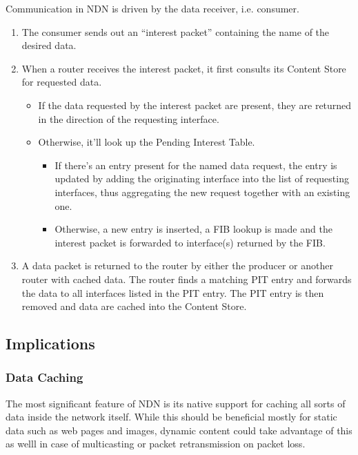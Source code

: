                 Communication in NDN is driven by the data receiver, i.e. consumer.

                \begin{enumerate}
                    \item The consumer sends out an ``interest packet'' containing the name of the desired data.
                    \item When a router receives the interest packet, it first consults its Content Store for requested data.
                        \begin{itemize}
                            \item If the data requested by the interest packet are present, they are returned in the direction of the requesting interface.
                            \item Otherwise, it'll look up the Pending Interest Table.
                            \begin{itemize}
                                \item If there's an entry present for the named data request, the entry is updated by adding the originating interface into the list of requesting interfaces, thus aggregating the new request together with an existing one.
                                \item Otherwise, a new entry is inserted, a FIB lookup is made and the interest packet is forwarded to interface(s) returned by the FIB.
                            \end{itemize}
                        \end{itemize}
                    \item A data packet is returned to the router by either the producer or another router with cached data. The router finds a matching PIT entry and forwards the data to all interfaces listed in the PIT entry. The PIT entry is then removed and data are cached into the Content Store.
                \end{enumerate}

        \subsection{Implications}
            \subsubsection{Data Caching}
                The most significant feature of NDN is its native support for caching all sorts of data inside the network itself. While this should be beneficial mostly for static data such as web pages and images, dynamic content could take advantage of this as welll in case of multicasting or packet retransmission on packet loss.

